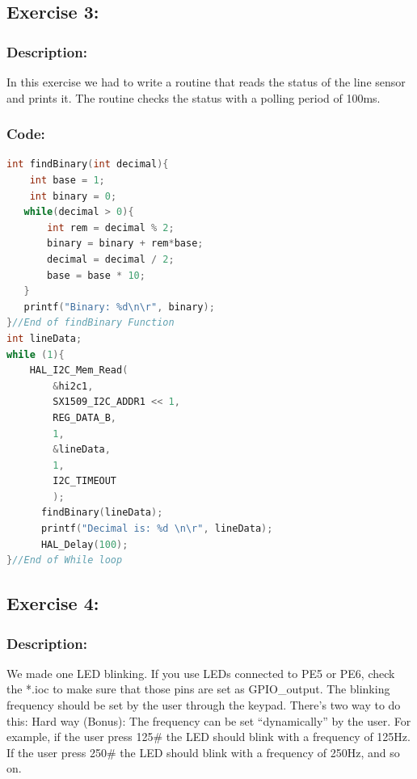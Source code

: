 \documentclass[english]{article}
\begin{document}
\subsection{Exercise 3:}
\subsubsection{Description:}
In this exercise we had to write a routine that reads the status of the 
line sensor and prints it. The routine checks the status with a polling
 period of 100ms.
\subsubsection{Code:}
\begin{lstlisting}[language=C, caption={Reading Line Data}, label={lst:label} ]
int findBinary(int decimal){
	int base = 1;
	int binary = 0;
   while(decimal > 0){
	   int rem = decimal % 2;
	   binary = binary + rem*base;
	   decimal = decimal / 2;
	   base = base * 10;
   }
   printf("Binary: %d\n\r", binary);
}//End of findBinary Function
int lineData;
while (1){
    HAL_I2C_Mem_Read(
        &hi2c1,
        SX1509_I2C_ADDR1 << 1,
        REG_DATA_B,
        1,
        &lineData,
        1,
        I2C_TIMEOUT
        );
	  findBinary(lineData);
	  printf("Decimal is: %d \n\r", lineData);
	  HAL_Delay(100);
}//End of While loop
\end{lstlisting}


\newpage
\subsection{Exercise 4:}
\subsubsection{Description:}
We made one LED blinking. If you use LEDs connected to PE5 or PE6, check the *.ioc to make sure that those pins are set as GPIO\_output. The blinking frequency should be
set by the user through the keypad. There’s two way to do this:
Hard way (Bonus): The frequency can be set “dynamically” by the user. For example, if the user
press 125\# the LED should blink with a frequency of 125Hz. If the user press 250\# the LED should
blink with a frequency of 250Hz, and so on.
\end{document}
